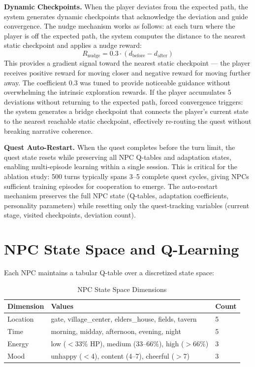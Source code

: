 \documentclass[12pt, a4paper, oneside]{report}
\begin{document}
\textbf{Dynamic Checkpoints.} When the player deviates from the expected path, the system generates dynamic checkpoints that acknowledge the deviation and guide convergence. The nudge mechanism works as follows: at each turn where the player is off the expected path, the system computes the distance to the nearest static checkpoint and applies a nudge reward:
\begin{equation}
    R_{\text{nudge}} = 0.3 \cdot (d_{\text{before}} - d_{\text{after}})
\end{equation}
This provides a gradient signal toward the nearest static checkpoint --- the player receives positive reward for moving closer and negative reward for moving further away. The coefficient 0.3 was tuned to provide noticeable guidance without overwhelming the intrinsic exploration rewards. If the player accumulates 5 deviations without returning to the expected path, forced convergence triggers: the system generates a bridge checkpoint that connects the player's current state to the nearest reachable static checkpoint, effectively re-routing the quest without breaking narrative coherence.

\textbf{Quest Auto-Restart.} When the quest completes before the turn limit, the quest state resets while preserving all NPC Q-tables and adaptation states, enabling multi-episode learning within a single session. This is critical for the ablation study: 500 turns typically spans 3--5 complete quest cycles, giving NPCs sufficient training episodes for cooperation to emerge. The auto-restart mechanism preserves the full NPC state (Q-tables, adaptation coefficients, personality parameters) while resetting only the quest-tracking variables (current stage, visited checkpoints, deviation count).

\section{NPC State Space and Q-Learning}
\label{sec:q-learning}

Each NPC maintains a tabular Q-table over a discretized state space:

\begin{table}[H]
\centering
\caption{NPC State Space Dimensions}
\label{tab:state_space}
\begin{tabular}{lll}
\toprule
\textbf{Dimension} & \textbf{Values} & \textbf{Count} \\
\midrule
Location & gate, village\_center, elders\_house, fields, tavern & 5 \\
Time & morning, midday, afternoon, evening, night & 5 \\
Energy & low ($<$33\% HP), medium (33--66\%), high ($>$66\%) & 3 \\
Mood & unhappy ($<$4), content (4--7), cheerful ($>$7) & 3 \\
\bottomrule
\end{tabular}
\end{table}
\end{document}
